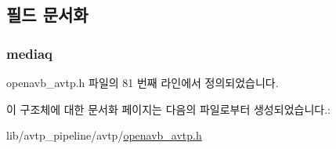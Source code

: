 \subsection{필드 문서화}
\subsubsection[{\texorpdfstring{mediaq}{mediaq}}]{ mediaq}\hypertarget{structavtp__state__t_a819df779bef725f318d02f2d250c0ceb}{}\label{structavtp__state__t_a819df779bef725f318d02f2d250c0ceb}


openavb\+\_\+avtp.\+h 파일의 81 번째 라인에서 정의되었습니다.



이 구조체에 대한 문서화 페이지는 다음의 파일로부터 생성되었습니다.\+:\begin{DoxyCompactItemize}
\item 
lib/avtp\+\_\+pipeline/avtp/\hyperlink{openavb__avtp_8h}{openavb\+\_\+avtp.\+h}\end{DoxyCompactItemize}
